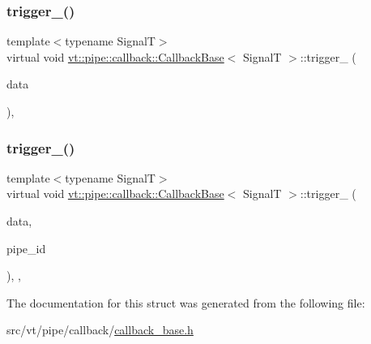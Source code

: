 \subsubsection{\texorpdfstring{trigger\+\_\+()}{trigger\_()}\hspace{0.1cm}{\footnotesize\ttfamily [1/2]}}
{\footnotesize\ttfamily template$<$typename SignalT$>$ \\
virtual void \hyperlink{structvt_1_1pipe_1_1callback_1_1_callback_base}{vt\+::pipe\+::callback\+::\+Callback\+Base}$<$ SignalT $>$\+::trigger\+\_\+ (\begin{DoxyParamCaption}\item[{\hyperlink{structvt_1_1pipe_1_1callback_1_1_callback_base_aa1c1fd83b75220a50f6dcd7c1617726e}{Signal\+Data\+Type} $\ast$}]{data }\end{DoxyParamCaption})\hspace{0.3cm}{\ttfamily [protected]}, {}}

\mbox{\label{structvt_1_1pipe_1_1callback_1_1_callback_base_ac14c6c68a45c6f7e18c73daa45b23b83}} 
\subsubsection{\texorpdfstring{trigger\+\_\+()}{trigger\_()}\hspace{0.1cm}{\footnotesize\ttfamily [2/2]}}
{\footnotesize\ttfamily template$<$typename SignalT$>$ \\
virtual void \hyperlink{structvt_1_1pipe_1_1callback_1_1_callback_base}{vt\+::pipe\+::callback\+::\+Callback\+Base}$<$ SignalT $>$\+::trigger\+\_\+ (\begin{DoxyParamCaption}\item[{\hyperlink{structvt_1_1pipe_1_1callback_1_1_callback_base_aa1c1fd83b75220a50f6dcd7c1617726e}{Signal\+Data\+Type} $\ast$}]{data,  }\item[{\hyperlink{namespacevt_ac9852acda74d1896f48f406cd72c7bd3}{Pipe\+Type} const \&}]{pipe\+\_\+id }\end{DoxyParamCaption})\hspace{0.3cm}{\ttfamily [inline]}, {\ttfamily [protected]}, {\ttfamily [virtual]}}



The documentation for this struct was generated from the following file\+:\begin{DoxyCompactItemize}
\item 
src/vt/pipe/callback/\hyperlink{callback__base_8h}{callback\+\_\+base.\+h}\end{DoxyCompactItemize}
